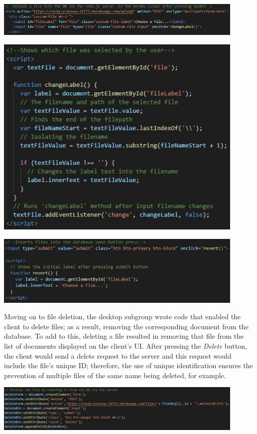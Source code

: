 \documentclass{article}
\begin{document}
\includegraphics[width=12cm]{upload}

\includegraphics[width=12cm]{upload2}

\includegraphics[width=12cm]{upload3}

Moving on to file deletion, the desktop subgroup wrote code that enabled the client to delete files; as a result, removing the corresponding document from the database. To add to this, deleting a file resulted in removing that file from the list of documents displayed on the client's UI. After pressing the \textit{Delete} button, the client would send a delete request to the server and this request would include the file's unique ID; therefore, the use of unique identification ensures the prevention of multiple files of the same name being deleted, for example. 

\includegraphics[width=12cm]{delete}
\end{document}
